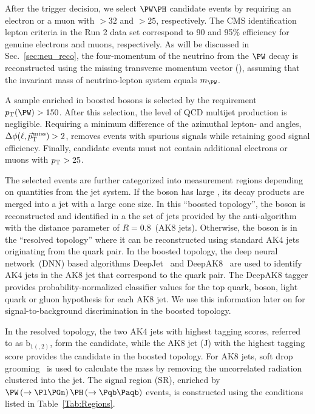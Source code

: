 \documentclass[a4paper,11pt]{article}
\newcommand{\Pb}{{{\Pqb}}\xspace}
\newcommand{\PAb}{{{{\Paqb}}}\xspace}
\begin{document}
After the trigger decision, we select $\PW\PH$ candidate events by requiring an electron or a muon with \pt$>32$ and $>25$\GeV, respectively. 
The CMS identification lepton criteria in the Run 2 data set correspond to 90 and 95\% efficiency for genuine electrons and muons, respectively. 
As will be discussed in Sec.~\ref{sec:neu_reco}, the four-momentum of the neutrino from the $\PW$ decay is reconstructed using the missing transverse momentum vector (\ptvecmiss), assuming that the invariant mass of neutrino-lepton system equals $m_{\PW}$.

A sample enriched in boosted \PW bosons is selected by the requirement $\pt(\PW) > 150$\GeV. 
After this selection, the level of QCD multijet production is negligible.
Requiring a minimum difference of the azimuthal lepton- and \ptmiss angles, $\Delta\phi(\ell,{\vec p}_{\mathrm{T}}^{\kern1pt\text{miss}})>2$, removes events with spurious signals while retaining good signal efficiency.
Finally, \PW candidate events must not contain additional electrons or muons with $p_{\mathrm{T}}>25$\GeV.

The selected events are further categorized into measurement regions depending on quantities from the jet system. 
If the \PH boson has large \pt, its decay products are merged into a jet with a large cone size. 
In this ``boosted topology'', the \PH boson is reconstructed and identified in a the set of jets provided by the anti-\kt algorithm with the distance parameter of $R=0.8$~(AK8 jets).
Otherwise, the \PH boson is in the ``resolved topology'' where it can be reconstructed using standard AK$4$ jets originating from the \Pb quark pair. 
In the boosted topology, the deep neural network~(DNN) based algorithms DeepJet~\cite{Bols:2020bkb} and DeepAK8~\cite{Sirunyan:2020lcu} are used to identify AK4 jets in the AK8 jet that correspond to the \Pb quark pair.
The DeepAK8 tagger provides probability-normalized classifier values for the top quark, \PW boson, light quark or gluon hypothesis for each AK8 jet. We use this information later on for signal-to-background discrimination in the boosted topology. %

In the resolved topology, the two AK4 jets with highest \Pb tagging scores, referred to as $\textrm{b}_{1(,2)}$, form the \PH candidate, while the AK8 jet ($\textrm{J}$) with the highest \PH tagging score provides the \PH candidate in the boosted topology.
For AK8 jets, soft drop grooming~\cite{Larkoski:2014wba} is used to calculate the mass by removing the uncorrelated radiation clustered into the jet. 
The signal region (SR), enriched by $\PW\left(\rightarrow \Pl \Pgn \right) \PH \left(\rightarrow \Pb \PAb \right)$ events, is constructed using the conditions listed in Table~\ref{Tab:Regions}.
\end{document}
